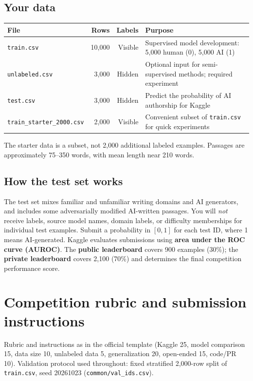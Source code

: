 \documentclass[11pt,letterpaper]{article}
\newcommand{\smallnote}[1]{{\small\color{muted}#1}}
\begin{document}
\subsection*{Your data}
\begin{tabularx}{\linewidth}{@{}lrrY@{}}
\toprule
\textbf{File} & \textbf{Rows} & \textbf{Labels} & \textbf{Purpose} \\
\midrule
\texttt{train.csv} & 10,000 & Visible & Supervised model development: 5,000 human (0), 5,000 AI (1) \\
\texttt{unlabeled.csv} & 3,000 & Hidden & Optional input for semi-supervised methods; required experiment \\
\texttt{test.csv} & 3,000 & Hidden & Predict the probability of AI authorship for Kaggle \\
\texttt{train\_starter\_2000.csv} & 2,000 & Visible & Convenient subset of \texttt{train.csv} for quick experiments \\
\bottomrule
\end{tabularx}

\smallnote{The starter data is a subset, not 2,000 additional labeled examples. Passages are approximately 75--350 words, with mean length near 210 words.}

\subsection*{How the test set works}
The test set mixes familiar and unfamiliar writing domains and AI generators, and includes some adversarially modified AI-written passages. You will \emph{not} receive labels, source model names, domain labels, or difficulty memberships for individual test examples. Submit a probability in $[0,1]$ for each test ID, where 1 means AI-generated. Kaggle evaluates submissions using \textbf{area under the ROC curve (AUROC)}. The \textbf{public leaderboard} covers 900 examples (30\%); the \textbf{private leaderboard} covers 2,100 (70\%) and determines the final competition performance score.

\vfill
\newpage
\section{Competition rubric and submission instructions}
\smallnote{Rubric and instructions as in the official template (Kaggle 25, model comparison 15, data size 10, unlabeled data 5, generalization 20, open-ended 15, code/PR 10). Validation protocol used throughout: fixed stratified 2,000-row split of \texttt{train.csv}, seed 20261023 (\texttt{common/val\_ids.csv}).}
\end{document}
